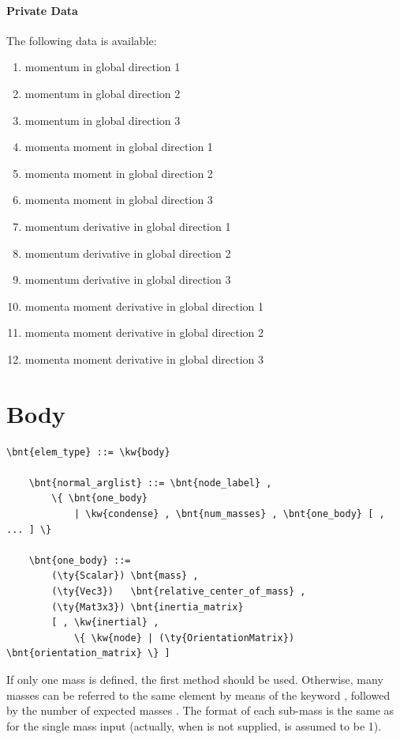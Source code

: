\paragraph{Private Data}
The following data is available:
\begin{enumerate}
\item {} momentum in global direction 1
\item {} momentum in global direction 2
\item {} momentum in global direction 3
\item {} momenta moment in global direction 1
\item {} momenta moment in global direction 2
\item {} momenta moment in global direction 3
\item {} momentum derivative in global direction 1
\item {} momentum derivative in global direction 2
\item {} momentum derivative in global direction 3
\item {} momenta moment derivative in global direction 1
\item {} momenta moment derivative in global direction 2
\item {} momenta moment derivative in global direction 3
\end{enumerate}





\section{Body}
\begin{Verbatim}[commandchars=\\\{\}]
    \bnt{elem_type} ::= \kw{body}

    \bnt{normal_arglist} ::= \bnt{node_label} ,
        \{ \bnt{one_body}
            | \kw{condense} , \bnt{num_masses} , \bnt{one_body} [ , ... ] \}

    \bnt{one_body} ::=
        (\ty{Scalar}) \bnt{mass} , 
        (\ty{Vec3})   \bnt{relative_center_of_mass} ,
        (\ty{Mat3x3}) \bnt{inertia_matrix}
        [ , \kw{inertial} , 
            \{ \kw{node} | (\ty{OrientationMatrix}) \bnt{orientation_matrix} \} ]
\end{Verbatim}
If only one mass is defined, the first method should be used. Otherwise,
many masses can be referred to the same element by means of the keyword
, followed by the number of expected masses .
The format of each sub-mass is the same as for the single mass input (actually, 
when  is not supplied,  is assumed to be 1).

